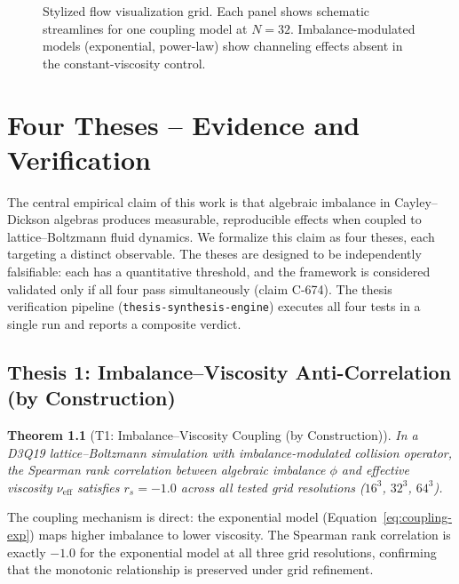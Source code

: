 \documentclass[12pt,openany]{report}
\theoremstyle{definition}
\theoremstyle{plain}
\newtheorem{theorem}{Theorem}[chapter]
\theoremstyle{remark}
\begin{document}
\begin{figure}[htbp]
\centering

\caption{Stylized flow visualization grid.  Each panel shows
schematic streamlines for one coupling model at $N = 32$.
Imbalance-modulated models (exponential, power-law) show
channeling effects absent in the constant-viscosity control.}
\label{fig:flow-viz}
\end{figure}


\chapter{Four Theses -- Evidence and Verification}
\label{ch:theses}

The central empirical claim of this work is that algebraic imbalance in
Cayley--Dickson algebras produces measurable, reproducible effects when
coupled to lattice--Boltzmann fluid dynamics.  We formalize this claim as
four theses, each targeting a distinct observable.  The theses are designed
to be independently falsifiable: each has a quantitative threshold, and
the framework is considered validated only if all four pass simultaneously
(claim C-674).  The thesis verification pipeline
(\texttt{thesis-synthesis-engine}) executes all four tests in a single run
and reports a composite verdict.

\section{Thesis 1: Imbalance--Viscosity Anti-Correlation (by Construction)}
\label{sec:t1}

\begin{theorem}[T1: Imbalance--Viscosity Coupling (by Construction)]
In a D3Q19 lattice--Boltzmann simulation with imbalance-modulated
collision operator, the Spearman rank correlation between algebraic
imbalance $\phi$ and effective viscosity $\nu_{\mathrm{eff}}$ satisfies
$r_s = -1.0$ across all tested grid resolutions ($16^3$, $32^3$, $64^3$).
\end{theorem}

The coupling mechanism is direct: the exponential model
(Equation~\ref{eq:coupling-exp}) maps higher imbalance to lower viscosity.
The Spearman rank correlation is exactly $-1.0$ for the exponential model at
all three grid resolutions, confirming that the monotonic relationship is
preserved under grid refinement.
\end{document}

